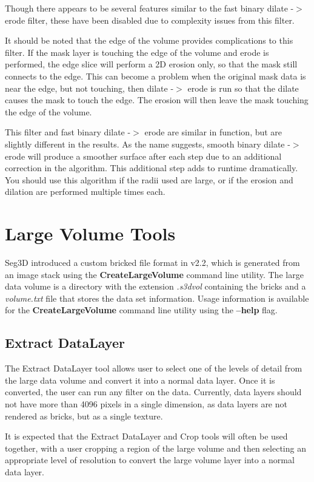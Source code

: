 \documentclass[fleqn,11pt,openany]{book}
\begin{document}
Though there appears to be several features similar to the fast binary dilate -$>$ erode filter, these have been disabled due to complexity issues from this filter.

It should be noted that the edge of the volume provides complications to this filter.  If the mask layer is touching the edge of the volume and erode is performed, the edge slice will perform a 2D erosion only, so that the mask still connects to the edge.  This can  become a problem when the original mask data is near the edge, but not touching, then dilate -$>$ erode is run so that the dilate causes the mask to touch the edge.  The erosion will then leave the mask touching the edge of the volume.

This filter and fast binary dilate -$>$ erode are similar in function, but are slightly different in the results.  As the name suggests, smooth binary dilate -$>$ erode will produce a smoother surface after each step due to an additional correction in the algorithm.  This additional step adds to runtime dramatically.  You should use this algorithm if the radii used are large, or if the erosion and dilation are performed multiple times each.  

\section{Large Volume Tools}

Seg3D introduced a custom bricked file format in v2.2, which is generated from an image stack using the \textbf{CreateLargeVolume} command line utility.
The large data volume is a directory with the extension \emph{.s3dvol} containing the bricks and a \emph{volume.txt} file that stores the data set information.
Usage information is available for the \textbf{CreateLargeVolume} command line utility using the \textbf{--help} flag.

\subsection{Extract DataLayer}

The Extract DataLayer tool allows user to select one of the levels of detail from the large data volume and convert it into a normal data layer. Once it is converted, the user can run any filter on the
data. Currently, data layers should not have more than 4096 pixels in a single dimension, as data layers are not rendered as bricks, but as a single texture.

It is expected that the Extract DataLayer and Crop tools will often be used together, with a user cropping a region of the large volume and then selecting an appropriate level of resolution to convert the large volume layer into a normal data layer.
\end{document}
